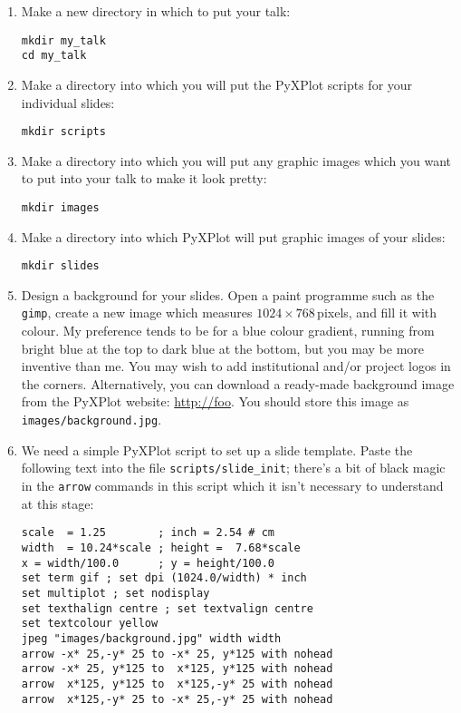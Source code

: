 \begin{enumerate}
\item Make a new directory in which to put your talk:
\begin{verbatim}
mkdir my_talk
cd my_talk
\end{verbatim}
\item Make a directory into which you will put the PyXPlot scripts for your
individual slides:
\begin{verbatim}
mkdir scripts
\end{verbatim}
\item Make a directory into which you will put any graphic images which you
want to put into your talk to make it look pretty:
\begin{verbatim}
mkdir images
\end{verbatim}
\item Make a directory into which PyXPlot will put graphic images of your
slides:
\begin{verbatim}
mkdir slides
\end{verbatim}
\item Design a background for your slides. Open a paint programme such as the
{\tt gimp}, create a new image which measures $1024\times768$\,pixels, and fill
it with colour. My preference tends to be for a blue colour gradient, running
from bright blue at the top to dark blue at the bottom, but you may be more
inventive than me. You may wish to add institutional and/or project logos in
the corners. Alternatively, you can download a ready-made background image from
the PyXPlot website: \url{http://foo}. You should store this image as {\tt
images/background.jpg}.
\item We need a simple PyXPlot script to set up a slide template. Paste the
following text into the file {\tt scripts/slide\_init}; there's a bit of black
magic in the {\tt arrow} commands in this script which it isn't necessary to
understand at this stage:\label{presentation_magic}
\begin{verbatim}
scale  = 1.25        ; inch = 2.54 # cm
width  = 10.24*scale ; height =  7.68*scale
x = width/100.0      ; y = height/100.0
set term gif ; set dpi (1024.0/width) * inch
set multiplot ; set nodisplay
set texthalign centre ; set textvalign centre
set textcolour yellow
jpeg "images/background.jpg" width width
arrow -x* 25,-y* 25 to -x* 25, y*125 with nohead
arrow -x* 25, y*125 to  x*125, y*125 with nohead
arrow  x*125, y*125 to  x*125,-y* 25 with nohead
arrow  x*125,-y* 25 to -x* 25,-y* 25 with nohead
\end{verbatim}

\end{enumerate}
